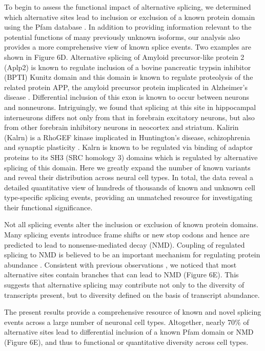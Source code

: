 To begin to assess the functional impact of alternative splicing, we determined which alternative sites lead to inclusion or exclusion of a known protein domain using the Pfam database \citep{Finn_2015}. In addition to providing information relevant to the potential functions of many previously unknown isoforms, our analysis also provides a more comprehensive view of known splice events. Two examples are shown in Figure 6D. Alternative splicing of Amyloid precursor-like protein 2 (Aplp2) is known to regulate inclusion of a bovine pancreatic trypsin inhibitor (BPTI) Kunitz domain \citep{Sandbrink_1997} and this domain is known to regulate proteolysis of the related protein APP, the amyloid precursor protein implicated in Alzheimer's disease \citep{Beckmann_2016}. Differential inclusion of this exon is known to occur between neurons and nonneurons. Intriguingly, we found that splicing at this site in hippocampal interneurons differs not only from that in forebrain excitatory neurons, but also from other forebrain inhibitory neurons in neocortex and striatum. Kalirin (Kalrn) is a RhoGEF kinase implicated in Huntington's disease, schizophrenia and synaptic plasticity \citep{Penzes_2008}. Kalrn is known to be regulated via binding of adaptor proteins to its SH3 (SRC homology 3) domains \citep{Schiller_2006} which is regulated by alternative splicing of this domain. Here we greatly expand the number of known variants and reveal their distribution across neural cell types. In total, the data reveal a detailed quantitative view of hundreds of thousands of known and unknown cell type-specific splicing events, providing an unmatched resource for investigating their functional significance.

Not all splicing events alter the inclusion or exclusion of known protein domains. Many splicing events introduce frame shifts or new stop codons and hence are predicted to lead to nonsense-mediated decay (NMD). Coupling of regulated splicing to NMD is believed to be an important mechanism for regulating protein abundance \citep{Lewis_2002}. Consistent with previous observations \citep{Yan_2015,Mauger_2017}, we noticed that most alternative sites contain branches that can lead to NMD (Figure 6E). This suggests that alternative splicing may contribute not only to the diversity of transcripts present, but to diversity defined on the basis of transcript abundance. 

The present results provide a comprehensive resource of known and novel splicing events across a large number of neuronal cell types. Altogether, nearly 70\% of alternative sites lead to differential inclusion of a known Pfam domain or NMD (Figure 6E), and thus to functional or quantitative diversity across cell types.
